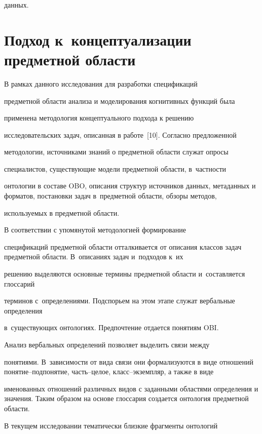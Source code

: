 данных.



\section{Подход к~концептуализации предметной области}



      В рамках данного исследования для разработки спецификаций 

предметной области анализа и моделирования когнитивных функций была 

применена методология концептуального подхода к решению 

исследовательских задач, описанная в работе~[10]. Согласно предложенной 

методологии, источниками знаний о предметной области служат опросы 

специалистов, существующие модели предметной области, в~частности 

онтологии в составе OBO, описания структур источников данных, метаданных и форматов, постановки задач в~предметной области, обзоры методов, 

используемых в предметной области.

      

      В соответствии с упомянутой методологией формирование 

спецификаций предметной области отталкивается от описания классов задач предметной об\-ласти. В~описаниях задач и~подходов к~их 

решению выделяются основные термины предметной области и~составляется глоссарий 

терминов с~определениями. Подспорьем на этом этапе служат вербальные определения 

в~существующих онтологиях. Предпочтение отдается понятиям OBI.

      

      Анализ вербальных определений позволяет выделить связи между 

понятиями. В~зависимости от вида связи они формализуются в виде отношений по\-ня\-тие--под\-по\-ня\-тие, часть--це\-лое, класс--экземпляр, а также в виде 

именованных отношений различных видов с заданными областями определения и значения. Таким образом на основе глоссария создается онтология предметной области.

      

      В текущем исследовании тематически близкие фрагменты онтологий 

